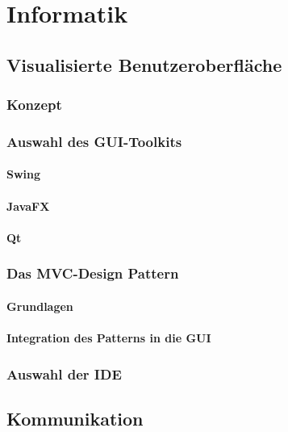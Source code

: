 
\chapter{Informatik}

\section{Visualisierte Benutzeroberfläche}
\label{sec:gui}
    \subsection{Konzept}

    \subsection{Auswahl des GUI-Toolkits}
        \subsubsection{Swing}
        \subsubsection{JavaFX}
        \subsubsection{Qt}

    \subsection{Das MVC-Design Pattern}
        \subsubsection{Grundlagen}
        \subsubsection{Integration des Patterns in die GUI}

    \subsection{Auswahl der IDE}

\section{Kommunikation}
\label{sec:communication}

